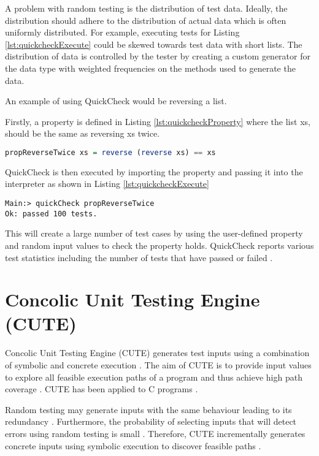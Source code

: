 A problem with random testing is the distribution of test data. Ideally, the distribution should adhere to the distribution of actual data which is often uniformly distributed. For example, executing tests for Listing \ref{lst:quickcheckExecute} could be skewed towards test data with short lists. The distribution of data is controlled by the tester by creating a custom generator for the data type with weighted frequencies on the methods used to generate the data.

An example of using QuickCheck would be reversing a list.

Firstly, a property is defined in Listing \ref{lst:quickcheckProperty} where the list xs, should be the same as reversing xs twice.

\begin{lstlisting}[language=haskell, label={lst:quickcheckProperty}, caption={Property for reversing a list in QuickCheck}]
propReverseTwice xs = reverse (reverse xs) == xs
\end{lstlisting}

QuickCheck is then executed by importing the property and passing it into the interpreter as shown in Listing \ref{lst:quickcheckExecute}

\begin{lstlisting}[label={lst:quickcheckExecute}, caption={Executing tests to check a list is reversed}]
Main:> quickCheck propReverseTwice
Ok: passed 100 tests.
\end{lstlisting}

This will create a large number of test cases by using the user-defined property and random input values to check the property holds. QuickCheck reports various test statistics including the number of tests that have passed or failed \cite{QClightweight}.


\section{Concolic Unit Testing Engine (CUTE)}
Concolic Unit Testing Engine (CUTE) generates test inputs using a combination of symbolic and concrete execution \cite{CUTE}. The aim of CUTE is to provide input values to explore all feasible execution paths of a program and thus achieve high path coverage \cite{CUTE}. CUTE has been applied to C programs \cite{CUTE}.

Random testing may generate inputs with the same behaviour leading to its redundancy \cite{CUTE}. Furthermore, the probability of selecting inputs that will detect errors using random testing is small \cite{CUTE}. 
Therefore, CUTE incrementally generates concrete inputs using symbolic execution to discover feasible paths \cite{CUTE}.

